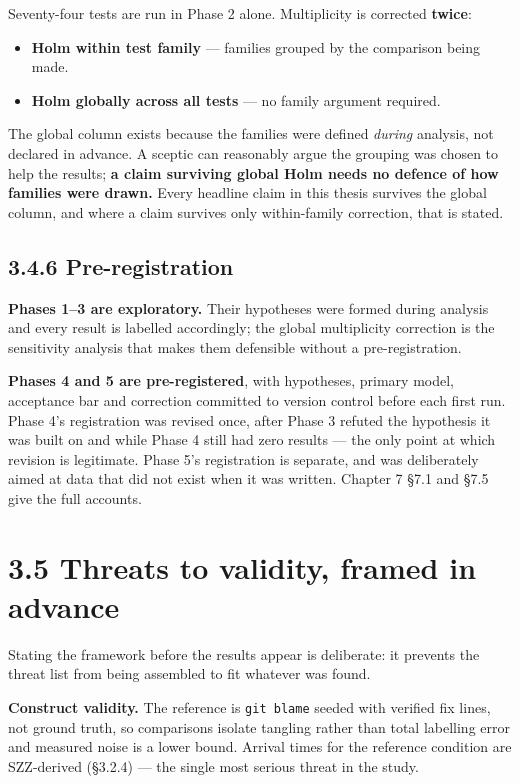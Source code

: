 Seventy-four tests are run in Phase 2 alone. Multiplicity is corrected
\textbf{twice}:

\begin{itemize}
\tightlist
\item
  \textbf{Holm within test family} --- families grouped by the
  comparison being made.
\item
  \textbf{Holm globally across all tests} --- no family argument
  required.
\end{itemize}

The global column exists because the families were defined \emph{during}
analysis, not declared in advance. A sceptic can reasonably argue the
grouping was chosen to help the results; \textbf{a claim surviving
global Holm needs no defence of how families were drawn.} Every headline
claim in this thesis survives the global column, and where a claim
survives only within-family correction, that is stated.

\subsection{3.4.6 Pre-registration}\label{pre-registration}

\textbf{Phases 1--3 are exploratory.} Their hypotheses were formed
during analysis and every result is labelled accordingly; the global
multiplicity correction is the sensitivity analysis that makes them
defensible without a pre-registration.

\textbf{Phases 4 and 5 are pre-registered}, with hypotheses, primary
model, acceptance bar and correction committed to version control before
each first run. Phase 4's registration was revised once, after Phase 3
refuted the hypothesis it was built on and while Phase 4 still had zero
results --- the only point at which revision is legitimate. Phase 5's
registration is separate, and was deliberately aimed at data that did
not exist when it was written. Chapter 7 \S{}7.1 and \S{}7.5 give the full
accounts.

\section{3.5 Threats to validity, framed in
advance}\label{threats-to-validity-framed-in-advance}

Stating the framework before the results appear is deliberate: it
prevents the threat list from being assembled to fit whatever was found.

\textbf{Construct validity.} The reference is \texttt{git\ blame} seeded
with verified fix lines, not ground truth, so comparisons isolate
tangling rather than total labelling error and measured noise is a lower
bound. Arrival times for the reference condition are SZZ-derived
(\S{}3.2.4) --- the single most serious threat in the study.

